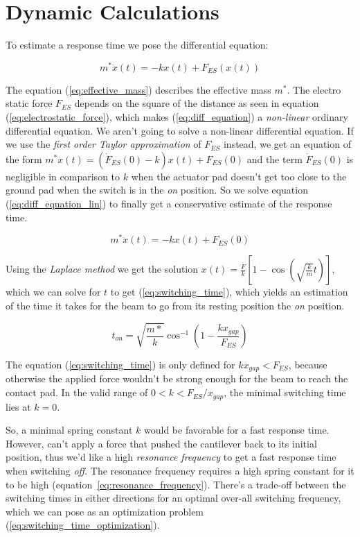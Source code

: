 \appendix
\section{Dynamic Calculations}

To estimate a response time we pose the differential equation:

\begin{equation}
    m^* \ddot{x}(t) = -kx(t) + F_{ES}(x(t))
    \label{eq:diff_equation}
\end{equation}

The equation (\ref{eq:effective_mass}) describes the effective mass $m^*$.
The electro static force $F_{ES}$ depends on the square of the distance as seen in equation (\ref{eq:electrostatic_force}), which makes (\ref{eq:diff_equation}) a \emph{non-linear} ordinary differential equation.
We aren't going to solve a non-linear differential equation.
If we use the \emph{first order Taylor approximation} of $F_{ES}$ instead, we get an equation of the form $m^* \ddot{x}(t) = (\dot{F}_{ES}(0) - k) x(t) + F_{ES}(0)$ and the term $\dot{F}_{ES}(0)$ is negligible in comparison to $k$ when the actuator pad doesn't get too close to the ground pad when the switch is in the \emph{on} position.
So we solve equation (\ref{eq:diff_equation_lin}) to finally get a conservative estimate of the response time.

\begin{equation}
    m^* \ddot{x}(t) = -kx(t) + F_{ES}(0)
    \label{eq:diff_equation_lin}
\end{equation}

Using the \emph{Laplace method} we get the solution $x(t) = \frac{F}{k}\left[1-\cos{\left(\sqrt{\frac{k}{m}}t\right)}\right]$, which we can solve for $t$ to get (\ref{eq:switching_time}), which yields an estimation of the time it takes for the beam to go from its resting position the \emph{on} position.

\begin{equation}
    t_{on} = \sqrt{\frac{m*}{k}} \cos^{-1}{\left( 1 - \frac{k x_{gap}}{F_{ES}} \right)} 
    \label{eq:switching_time}
\end{equation}

The equation (\ref{eq:switching_time}) is only defined for $k x_{gap} < F_{ES}$, because otherwise the applied force wouldn't be strong enough for the beam to reach the contact pad.
In the valid range of $0 < k < F_{ES}/x_{gap}$, the minimal switching time lies at $k = 0$.

So, a minimal spring constant $k$ would be favorable for a fast response time.
However, can't apply a force that pushed the cantilever back to its initial position, thus we'd like a high \emph{resonance frequency} to get a fast response time when switching \emph{off}.
The resonance frequency requires a high spring constant for it to be high (equation~\ref{eq:resonance_frequency}).
There's a trade-off between the switching times in either directions for an optimal over-all switching frequency, which we can pose as an optimization problem (\ref{eq:switching_time_optimization}).


